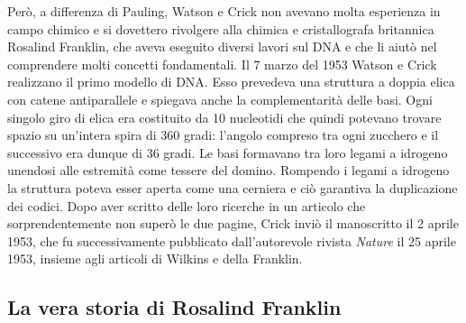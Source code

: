 \documentclass[11pt]{report}
\begin{document}
	Però, a differenza di Pauling, Watson e Crick non avevano molta esperienza in campo chimico e si dovettero rivolgere alla chimica e cristallografa britannica Rosalind Franklin, che aveva eseguito diversi lavori sul DNA e che li aiutò nel comprendere molti concetti fondamentali.
	Il 7 marzo del 1953 Watson e Crick realizzano il primo modello di DNA. Esso prevedeva una struttura a doppia elica con catene antiparallele e spiegava anche la complementarità delle basi. Ogni singolo giro di elica era costituito da 10 nucleotidi che quindi potevano trovare spazio su un'intera spira di 360 gradi: l'angolo compreso tra ogni zucchero e il successivo era dunque di 36 gradi. Le basi formavano tra loro legami a idrogeno unendosi alle estremità come tessere del domino. Rompendo i legami a idrogeno la struttura poteva esser aperta come una cerniera e ciò garantiva la duplicazione dei codici.\cite{watson1953molecular} Dopo aver scritto delle loro ricerche in un articolo che sorprendentemente non superò le due pagine, Crick inviò il manoscritto il 2 aprile 1953, che fu successivamente pubblicato dall'autorevole rivista \textit{Nature} il 25 aprile 1953, insieme agli articoli di Wilkins e della Franklin.
	
	\subsection{La vera storia di Rosalind Franklin}
	
\end{document}
